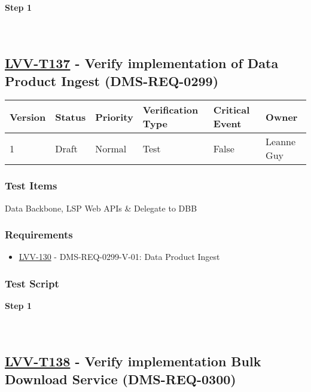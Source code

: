 \textbf{Step 1}\\
~\\
~\\

\hypertarget{lvv-t137---verify-implementation-of-data-product-ingest-dms-req-0299}{%
\subsection{\texorpdfstring{\href{https://jira.lsstcorp.org/secure/Tests.jspa\#/testCase/LVV-T137}{LVV-T137}
- Verify implementation of Data Product Ingest
(DMS-REQ-0299)}{LVV-T137 - Verify implementation of Data Product Ingest (DMS-REQ-0299)}}\label{lvv-t137---verify-implementation-of-data-product-ingest-dms-req-0299}}

\begin{longtable}[]{@{}llllll@{}}
\toprule
Version & Status & Priority & Verification Type & Critical Event &
Owner\tabularnewline
\midrule
\endhead
1 & Draft & Normal & Test & False & Leanne Guy\tabularnewline
\bottomrule
\end{longtable}

\hypertarget{test-items-113}{%
\subsubsection{Test Items}\label{test-items-113}}

Data Backbone, LSP Web APIs \& Delegate to DBB

\hypertarget{requirements-114}{%
\subsubsection{Requirements}\label{requirements-114}}

\begin{itemize}
\tightlist
\item
  \href{https://jira.lsstcorp.org/browse/LVV-130}{LVV-130} -
  DMS-REQ-0299-V-01: Data Product Ingest
\end{itemize}

\hypertarget{test-script-114}{%
\subsubsection{Test Script}\label{test-script-114}}

\textbf{Step 1}\\
~\\
~\\

\hypertarget{lvv-t138---verify-implementation-bulk-download-service-dms-req-0300}{%
\subsection{\texorpdfstring{\href{https://jira.lsstcorp.org/secure/Tests.jspa\#/testCase/LVV-T138}{LVV-T138}
- Verify implementation Bulk Download Service
(DMS-REQ-0300)}{LVV-T138 - Verify implementation Bulk Download Service (DMS-REQ-0300)}}\label{lvv-t138---verify-implementation-bulk-download-service-dms-req-0300}}

